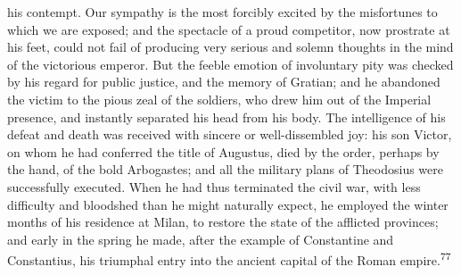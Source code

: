 his contempt. Our sympathy is the most forcibly excited by the
misfortunes to which we are exposed; and the spectacle of a proud
competitor, now prostrate at his feet, could not fail of
producing very serious and solemn thoughts in the mind of the
victorious emperor. But the feeble emotion of involuntary pity
was checked by his regard for public justice, and the memory of
Gratian; and he abandoned the victim to the pious zeal of the
soldiers, who drew him out of the Imperial presence, and
instantly separated his head from his body. The intelligence of
his defeat and death was received with sincere or well-dissembled
joy: his son Victor, on whom he had conferred the title of
Augustus, died by the order, perhaps by the hand, of the bold
Arbogastes; and all the military plans of Theodosius were
successfully executed. When he had thus terminated the civil war,
with less difficulty and bloodshed than he might naturally
expect, he employed the winter months of his residence at Milan,
to restore the state of the afflicted provinces; and early in the
spring he made, after the example of Constantine and Constantius,
his triumphal entry into the ancient capital of the Roman empire.\textsuperscript{77}



